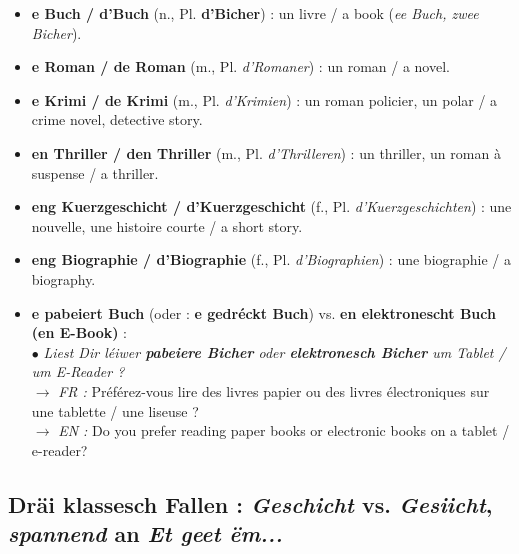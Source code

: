 \begin{itemize}
    \item \textbf{e Buch / d'Buch} (n., Pl. \textbf{d'Bicher}) : un livre / a book (\textit{ee Buch, zwee Bicher}).
    \item \textbf{e Roman / de Roman} (m., Pl. \textit{d'Romaner}) : un roman / a novel.
    \item \textbf{e Krimi / de Krimi} (m., Pl. \textit{d'Krimien}) : un roman policier, un polar / a crime novel, detective story.
    \item \textbf{en Thriller / den Thriller} (m., Pl. \textit{d'Thrilleren}) : un thriller, un roman à suspense / a thriller.
    \item \textbf{eng Kuerzgeschicht / d'Kuerzgeschicht} (f., Pl. \textit{d'Kuerzgeschichten}) : une nouvelle, une histoire courte / a short story.
    \item \textbf{eng Biographie / d'Biographie} (f., Pl. \textit{d'Biographien}) : une biographie / a biography.
    \item \textbf{e pabeiert Buch} (oder : \textbf{e gedréckt Buch}) vs. \textbf{en elektronescht Buch (en E-Book)} : \\
    $\bullet$ \textit{Liest Dir léiwer \textbf{pabeiere Bicher} oder \textbf{elektronesch Bicher} um Tablet / um E-Reader ?} \\
    $\rightarrow$ \textit{FR :} Préférez-vous lire des livres papier ou des livres électroniques sur une tablette / une liseuse ? \\
    $\rightarrow$ \textit{EN :} Do you prefer reading paper books or electronic books on a tablet / e-reader?
\end{itemize}

\subsection{Dräi klassesch Fallen : \textit{Geschicht} vs. \textit{Gesiicht}, \textit{spannend} an \textit{Et geet ëm...}}

